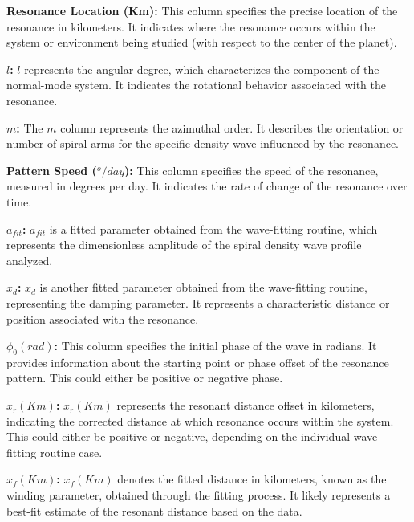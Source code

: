 \documentclass{article}
\begin{document}
\textbf{Resonance Location (Km):} This column specifies the precise location of the resonance in kilometers. It indicates where the resonance occurs within the system or environment being studied (with respect to the center of the planet).
    
\textbf{\(l\):} \(l\) represents the angular degree, which characterizes the component of the normal-mode system. It indicates the rotational behavior associated with the resonance.
    
\textbf{\(m\):} The \(m\) column represents the azimuthal order. It describes the orientation or number of spiral arms for the specific density wave influenced by the resonance.
    
\textbf{Pattern Speed (\(^{o}/day\)):} This column specifies the speed of the resonance, measured in degrees per day. It indicates the rate of change of the resonance over time.
    
\textbf{\(a_{fit}\):} \(a_{fit}\) is a fitted parameter obtained from the wave-fitting routine, which represents the dimensionless amplitude of the spiral density wave profile analyzed.
    
\textbf{\(x_{d}\):} \(x_{d}\) is another fitted parameter obtained from the wave-fitting routine, representing the damping parameter. It represents a characteristic distance or position associated with the resonance.
    
\textbf{\(\phi_{0}(rad)\):} This column specifies the initial phase of the wave in radians. It provides information about the starting point or phase offset of the resonance pattern. This could either be positive or negative phase.
    
\textbf{\(x_{r}(Km)\):} \(x_{r}(Km)\) represents the resonant distance offset in kilometers, indicating the corrected distance at which resonance occurs within the system. This could either be positive or negative, depending on the individual wave-fitting routine case.
    
\textbf{\(x_{f}(Km)\):} \(x_{f}(Km)\) denotes the fitted distance in kilometers, known as the winding parameter, obtained through the fitting process. It likely represents a best-fit estimate of the resonant distance based on the data.
\end{document}
